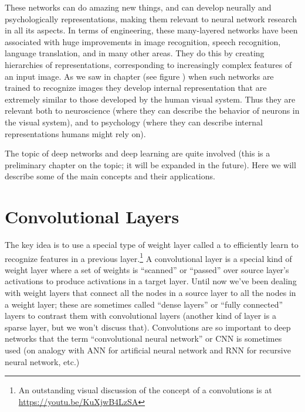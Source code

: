 These networks can do amazing new things, and can develop neurally and psychologically representations, making them relevant to neural network research in all its aspects. In terms of engineering, these many-layered networks have been associated with huge improvements in image recognition, speech recognition, language translation, and in many other areas. They do this by creating hierarchies of representations, corresponding  to increasingly complex features of an input image. As we saw in chapter  (see figure ) when such networks are trained to recognize images they develop internal representation that are extremely similar to those developed by the human visual  system. Thus they are relevant both to neuroscience (where they can describe the behavior of neurons in the visual system), and to psychology (where they can describe internal representations humans might rely on).

The topic of deep networks and deep learning are quite involved (this is a preliminary chapter on the topic; it will be expanded in the future). Here we will describe some of the main concepts and their applications.

\section{Convolutional Layers}

The key idea is to use a special type of weight layer called a  to efficiently learn to recognize features in a previous layer.\footnote{An outstanding visual discussion of the concept of a convolutions is at \url{https://youtu.be/KuXjwB4LzSA}} A convolutional layer is a special kind of weight layer where a set of weights is ``scanned'' or ``passed'' over source layer's activations to produce activations in a target layer. Until now we've been dealing with weight layers that connect all the nodes in a source layer to all the nodes in a weight layer; these are sometimes called ``dense layers'' or ``fully connected'' layers to contrast them with convolutional layers (another kind of layer is a sparse layer, but we won't discuss that).  Convolutions are so important to deep networks that the term ``convolutional neural network'' or CNN is sometimes used (on analogy with ANN for artificial neural network and RNN for recursive neural network, etc.)

